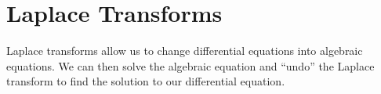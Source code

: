 \chapter{Laplace Transforms}
\noindent
Laplace transforms allow us to change differential equations into algebraic equations. We can then solve the algebraic equation and ``undo'' the Laplace transform to find the solution to our differential equation.





